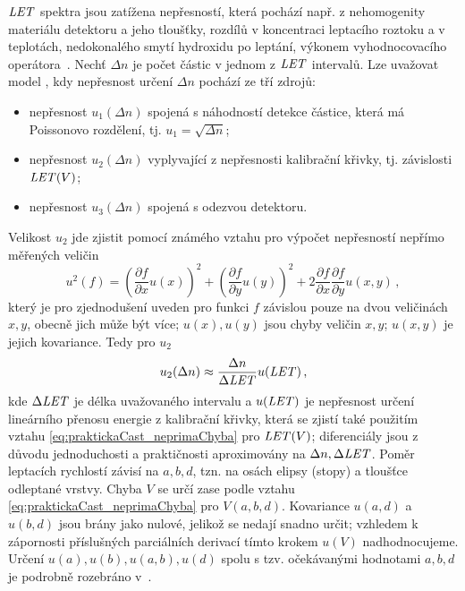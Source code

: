 $\mathit{LET}$ spektra jsou zatížena nepřesností, která pochází např. z nehomogenity materiálu detektoru a jeho tloušťky, rozdílů v koncentraci leptacího roztoku a v teplotách, nedokonalého smytí hydroxidu po leptání, výkonem vyhodnocovacího operátora~\cite{nejistoty}. Nechť $\Delta n$ je počet částic v jednom z $\mathit{LET}$ intervalů. Lze uvažovat model \cite{nejistoty}, kdy nepřesnost určení $\Delta n$ pochází ze tří zdrojů:
\begin{itemize}
  \item nepřesnost $u_1(\Delta n)$ spojená s náhodností detekce částice, která má Poissonovo rozdělení, tj. $u_1=\sqrt{\Delta n}$;
  \item nepřesnost $u_2(\Delta n)$ vyplyvající z nepřesnosti kalibrační křivky, tj. závislosti $\mathit{LET}(V)$;
  \item nepřesnost $u_3(\Delta n)$ spojená s odezvou detektoru.
\end{itemize}
Velikost $u_2$ jde zjistit pomocí známého vztahu pro výpočet nepřesností nepřímo měřených veličin
\begin{equation}
  u^2(f)=\left(\frac{\partial f}{\partial x}u(x)\right)^2+\left( \frac{\partial f}{\partial y}u(y) \right)^2+2\frac{\partial f}{\partial x}\frac{\partial f}{\partial y}u(x,y)\,,
  \label{eq:praktickaCast_neprimaChyba}
\end{equation}
který je pro zjednodušení uveden pro funkci $f$ závislou pouze na dvou veličinách $x,y$, obecně jich může být více; $u(x), u(y)$ jsou chyby veličin $x,y$; $u(x,y)$ je jejich kovariance. Tedy pro $u_2$
\begin{equation}
  u_2(\Delta n)\approx\frac{\Delta n}{\Delta\mathit{LET}}u(\mathit{LET})\,,
  \label{eq:praktickaCast_u2}
\end{equation}
kde $\Delta\mathit{LET}$ je délka uvažovaného intervalu a $u(\mathit{LET})$ je nepřesnost určení lineárního přenosu energie z kalibrační křivky, která se zjistí také použitím vztahu \eqref{eq:praktickaCast_neprimaChyba} pro $\mathit{LET}(V)$; diferenciály jsou z důvodu jednoduchosti a praktičnosti aproximovány na $\Delta n, \Delta\mathit{LET}$. Poměr leptacích rychlostí závisí na $a,b,d$, tzn. na osách elipsy (stopy) a tloušťce odleptané vrstvy. Chyba $V$ se určí zase podle vztahu \eqref{eq:praktickaCast_neprimaChyba} pro $V(a,b,d)$. Kovariance $u(a,d)$ a $u(b,d)$ jsou brány jako nulové, jelikož se nedají snadno určit; vzhledem k zápornosti příslušných parciálních derivací tímto krokem $u(V)$ nadhodnocujeme. Určení $u(a), u(b), u(a,b), u(d)$ spolu s tzv. očekávanými hodnotami $a,b,d$ je podrobně
rozebráno v~\cite{nejistoty}.

